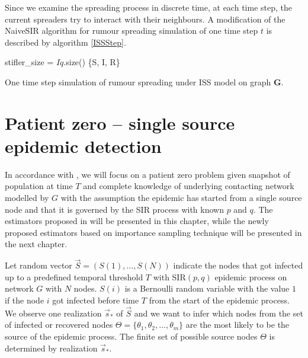 \documentclass[times, utf8, diplomski]{fer}
\begin{document}
Since we examine the spreading process in discrete time, at each time step, the current spreaders try to interact with their neighbours. A modification of the NaiveSIR algorithm for rumour spreading simulation of one time step $t$ is described by algorithm \ref{ISSStep}.

\begin{algorithm}[H]
 stifler\_size = $Iq$.size()\;
  \Return \{S, I, R\}
 \label{ISSStep}
 \caption{One time step simulation of rumour spreading under ISS model on graph $\mathbf{G}$.}
\end{algorithm}

\chapter{Patient zero -- single source epidemic detection}
\label{PZ}

In accordance with \cite{Nino}, we will focus on a patient zero problem given snapshot of population at time $T$ and complete knowledge of underlying contacting network modelled by $G$ with the assumption the epidemic has started from a single source node and that it is governed by the SIR process with known $p$ and $q$.  The estimators proposed in \cite{Nino} will be presented in this chapter, while the newly proposed estimators based on importance sampling  technique will be presented in the next chapter.

Let random vector $\vec S = (S(1), \ldots, S(N))$ indicate the nodes that got infected up to a predefined temporal threshold $T$ with SIR$(p, q)$ epidemic process on network $G$ with $N$ nodes. $S(i)$ is a Bernoulli random variable with the value $1$ if the node $i$ got infected before time $T$ from the start of the epidemic process. We observe one realization $\vec s_*$ of $\vec S$ and we want to infer which nodes from the set of infected or recovered nodes $\Theta = \{\theta_1, \theta_2, \ldots, \theta_m \}$ are the most likely to be the source of the epidemic process.  The finite set of possible source nodes $\Theta$ is determined by realization $\vec s_*$.
\end{document}
